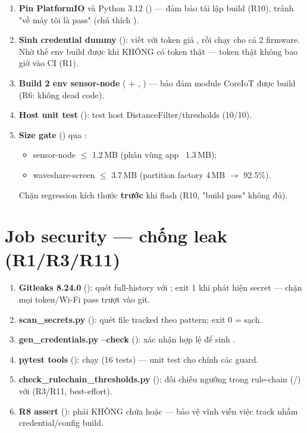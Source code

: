 \begin{enumerate}
\item \textbf{Pin PlatformIO}  và Python 3.12
  () — đảm bảo tái lập build (R10), tránh "về máy tôi là
  pass" (chú thích ).
\item \textbf{Sinh credential dummy} (): viết
   với token giả , rồi chạy
   cho cả 2 firmware.  Nhờ
  thế env  build được khi KHÔNG có token thật — token
  thật không bao giờ vào CI (R1).
\item \textbf{Build 2 env sensor-node} ( + ,
  ) — bảo đảm module CoreIoT được build (R6: không dead
  code).
\item \textbf{Host unit test} 
  (): test host DistanceFilter/thresholds (10/10).
\item \textbf{Size gate} () qua :
  \begin{itemize}
  \item sensor-node  $\le$ 1.{2}\,MB (phân vùng app
    ~1.3\,MB);
  \item waveshare-screen $\le$ 3.7\,MB (partition factory 4\,MB $\to$ 92.5\%).
  \end{itemize}
  Chặn regression kích thước \textbf{trước} khi flash (R10, "build pass" không
  đủ).
\end{enumerate}

\section{Job security — chống leak (R1/R3/R11)}
\label{sec:ci-security-detail}

\begin{enumerate}
\item \textbf{Gitleaks 8.24.0} (): quét full-history với
  ; exit 1 khi phát hiện secret — chặn mọi token/Wi-Fi pass
  trượt vào git.
\item \textbf{scan\_secrets.py} (): quét file tracked theo
  pattern; exit 0 = sạch.
\item \textbf{gen\_credentials.py --check} (): xác nhận
   hợp lệ để sinh .
\item \textbf{pytest tools} (): chạy
   (16 tests) — unit test cho chính các guard.
\item \textbf{check\_rulechain\_thresholds.py} (): đối
  chiếu ngưỡng trong rule-chain (/) với
   (R3/R11, best-effort).
\item \textbf{R8 assert} ():  phải
  KHÔNG chứa  hoặc  — bảo vệ vĩnh viễn việc
  track nhầm credential/config build.
\end{enumerate}

